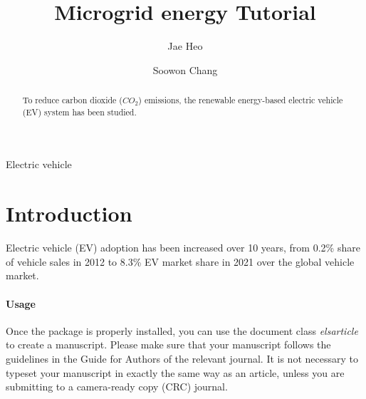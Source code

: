 \documentclass[review]{elsarticle}
\begin{document}
\begin{frontmatter}

\title{Microgrid energy Tutorial}


\author[mymainaddress]{Jae Heo}
\author[mysecondaryaddress]{Soowon Chang}

\address[mymainaddress]{School of Construction Management Technology, Purdue University, 401 N. Grant St., West Lafayette, IN 47907, USA, heo27@purdue.edu}
\address[mysecondaryaddress]{School of Construction Management Technology, Purdue University, 401 N. Grant St., West Lafayette, IN 47907, USA, chang776@purdue.edu}

\begin{abstract}
To reduce carbon dioxide ($CO_2$) emissions, the renewable energy-based electric vehicle (EV) system has been studied.
\end{abstract}

\begin{keyword}
Electric vehicle 
\end{keyword}

\end{frontmatter}

\linenumbers

\section{Introduction}

Electric vehicle (EV) adoption has been increased over 10 years, from 0.2\% share of vehicle sales in 2012 to 8.3\% EV market share in 2021 \cite{1} over the global vehicle market. 

\paragraph{Usage} Once the package is properly installed, you can use the document class \emph{elsarticle} to create a manuscript. Please make sure that your manuscript follows the guidelines in the Guide for Authors of the relevant journal. It is not necessary to typeset your manuscript in exactly the same way as an article, unless you are submitting to a camera-ready copy (CRC) journal.
\end{document}

